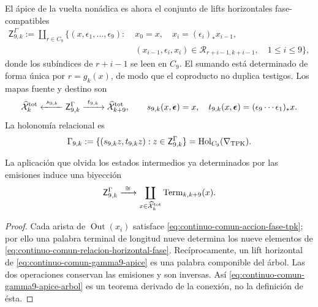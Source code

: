 El ápice de la vuelta nonádica es ahora el conjunto de lifts horizontales
fase-compatibles
\begin{equation}
\label{eq:continuo-comun-gamma9-apice}
 \begin{split}
 \mathsf Z^{\Gamma}_{9,k}:=\coprod_{r\in C_9}\bigl\{
 (x,\epsilon_1,\ldots,\epsilon_9):\;&x_0=x,\quad
 x_i=(\epsilon_i)_*x_{i-1},\\
 &(x_{i-1},\epsilon_i,x_i)
 \in\mathscr R_{r+i-1,k+i-1},\quad 1\leq i\leq9
 \bigr\},
 \end{split}
\end{equation}
 donde los subíndices de \(r+i-1\) se leen en \(C_9\). El sumando está
determinado de forma única por \(r=g_k(x)\), de modo que el coproducto no
duplica testigos. Los mapas fuente y
destino son
\begin{equation}
\label{eq:continuo-comun-gamma9-span}
 \widehat{\mathcal X}^{\rm tot}_k
 \xleftarrow{\ s_{9,k}\ }
 \mathsf Z^{\Gamma}_{9,k}
 \xrightarrow{\ t_{9,k}\ }
 \widehat{\mathcal X}^{\rm tot}_{k+9},
 \qquad
 s_{9,k}(x,\boldsymbol\epsilon)=x,\quad
 t_{9,k}(x,\boldsymbol\epsilon)
 =(\epsilon_9\cdots\epsilon_1)_*x.
\end{equation}
La holonomía relacional es
\begin{equation}
\label{eq:continuo-comun-gamma9-relacion}
 \Gamma_{9,k}:=
 \{(s_{9,k}z,t_{9,k}z):z\in\mathsf Z^{\Gamma}_{9,k}\}
 =\operatorname{Hol}_{C_9}(\nabla_{\rm TPK}).
\end{equation}

\begin{lemma}
\label{lem:continuo-comun-gamma9-arbol}
La aplicación que olvida los estados intermedios ya determinados por las
emisiones induce una biyección
\begin{equation}
\label{eq:continuo-comun-gamma9-apice-arbol}
 \mathsf Z^{\Gamma}_{9,k}
 \xrightarrow{\ \cong\ }
 \coprod_{x\in\widehat{\mathcal X}^{\rm tot}_k}
 \operatorname{Term}_{k,k+9}(x).
\end{equation}
\end{lemma}

\begin{proof}
Cada arista de \(\operatorname{Out}(x_i)\) satisface
\eqref{eq:continuo-comun-accion-fase-tpk}; por ello una palabra terminal de
longitud nueve determina los nueve elementos de
\eqref{eq:continuo-comun-relacion-horizontal-fase}. Recíprocamente, un lift
horizontal de \eqref{eq:continuo-comun-gamma9-apice} es una palabra
componible del árbol. Las dos operaciones conservan las emisiones y son
inversas. Así \eqref{eq:continuo-comun-gamma9-apice-arbol} es un teorema
derivado de la conexión, no la definición de ésta.
\end{proof}

